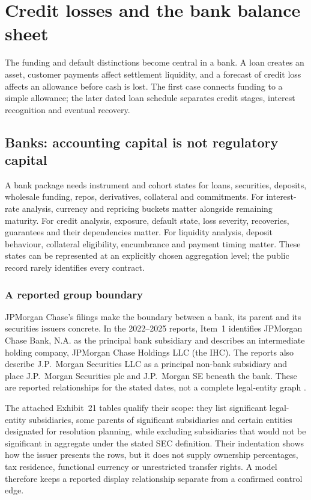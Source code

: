 \chapter{Credit losses and the bank balance sheet}
\label{ch:banking}

The funding and default distinctions become central in a bank. A loan creates
an asset, customer payments affect settlement liquidity, and a forecast of
credit loss affects an allowance before cash is lost. The first case connects
funding to a simple allowance; the later dated loan schedule separates credit
stages, interest recognition and eventual recovery.

\section{Banks: accounting capital is not regulatory capital}

A bank package needs instrument and cohort states for loans, securities,
deposits, wholesale funding, repos, derivatives, collateral and commitments.
For interest-rate analysis, currency and repricing buckets matter alongside
remaining maturity. For credit analysis, exposure, default state, loss severity,
recoveries, guarantees and their dependencies matter. For liquidity analysis,
deposit behaviour, collateral eligibility, encumbrance and payment timing matter.
These states can be represented at an explicitly chosen aggregation level;
the public record rarely identifies every contract.

\subsection{A reported group boundary}

JPMorgan Chase's filings make the boundary between a bank, its parent and its
securities issuers concrete. In the 2022--2025 reports, Item~1 identifies
JPMorgan Chase Bank, N.A. as the principal bank subsidiary and describes an
intermediate holding company, JPMorgan Chase Holdings LLC (the IHC). The
reports also describe J.P.~Morgan Securities LLC as a principal non-bank
subsidiary and place J.P.~Morgan Securities plc and J.P.~Morgan SE beneath the
bank. These are reported relationships for the stated dates, not a complete
legal-entity graph \citep{jpmorgan2022tenk,jpmorgan2023tenk,jpmorgan2024tenk,jpmorgan2025tenk}.

The attached Exhibit~21 tables qualify their scope: they list significant
legal-entity subsidiaries, some parents of significant subsidiaries and certain
entities designated for resolution planning, while excluding subsidiaries that
would not be significant in aggregate under the stated SEC definition. Their
indentation shows how the issuer presents the rows, but it does not supply
ownership percentages, tax residence, functional currency or unrestricted
transfer rights. A model therefore keeps a reported display relationship
separate from a confirmed control edge.

